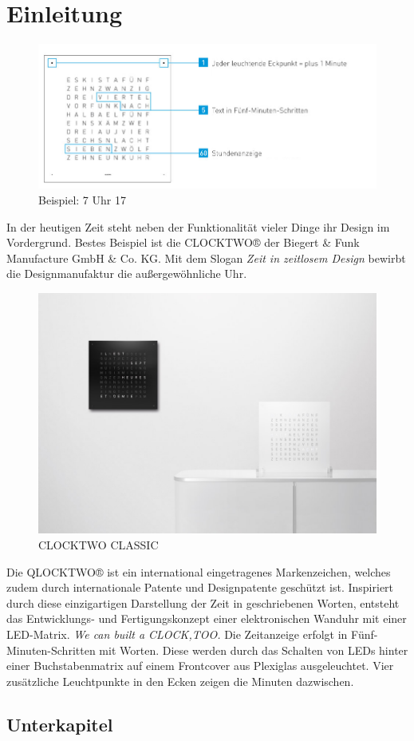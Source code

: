 
\section{Einleitung}
\label{sec:Einleitung}
\begin{figure}[h!]
    \centering
    \includegraphics[width=\textwidth]{Abbildungen/Uhrzeit_Beispiel}
    \caption[Uhrzeit_Bspl]{Beispiel: 7 Uhr 17}
    \label{fig:Uhrzeit_Bspl}
\end{figure}
%

In der heutigen Zeit steht neben der Funktionalität vieler Dinge ihr Design im Vordergrund. Bestes Beispiel ist die CLOCKTWO® der Biegert \&  Funk Manufacture GmbH \& Co. KG. Mit dem Slogan  \textit{Zeit in zeitlosem Design}  bewirbt die Designmanufaktur die außergewöhnliche Uhr. 
%
\begin{figure}[h]
    \centering
    \includegraphics[width=\columnwidth]{Abbildungen/29}
    \caption[ClockTwo]{CLOCKTWO CLASSIC}
    \label{fig:Verbindungsdialog}
\end{figure}
%
\newline Die QLOCKTWO® ist ein international eingetragenes Markenzeichen, welches zudem durch internationale Patente und Designpatente geschützt ist. Inspiriert durch diese einzigartigen Darstellung der Zeit in geschriebenen Worten, entsteht das Entwicklungs- und Fertigungskonzept einer elektronischen Wanduhr mit einer LED-Matrix. \textit{We can built a CLOCK,TOO.}
%
Die Zeitanzeige erfolgt in Fünf-Minuten-Schritten mit Worten. Diese werden durch das Schalten von LEDs hinter einer Buchstabenmatrix auf einem Frontcover aus Plexiglas ausgeleuchtet. Vier zusätzliche Leuchtpunkte in den Ecken zeigen die Minuten dazwischen.





\subsection{Unterkapitel}

